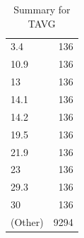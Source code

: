 \begin{table}[ht]
\begin{tabular}{lr}
  3.4 & 136 \\ 
  10.9 & 136 \\ 
  13 & 136 \\ 
  14.1 & 136 \\ 
  14.2 & 136 \\ 
  19.5 & 136 \\ 
  21.9 & 136 \\ 
  23 & 136 \\ 
  29.3 & 136 \\ 
  30 & 136 \\ 
  (Other) & 9294 \\ 
   \hline
\end{tabular}
\caption{Summary for TAVG} 
\label{tab: TAVG}
\end{table}
